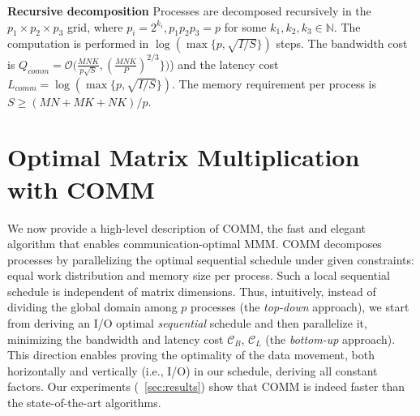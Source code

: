 \documentclass[sigplan,review,anonymous]{acmart}\settopmatter{printfolios=true,printccs=false,printacmref=false}
\newcommand\mac[1]{\textcolor{red}{[Mac: #1]}}
\newcommand{\macb}[1]{\textbf{\textsf{#1}}}
\begin{document}
\macb{Recursive decomposition}
%
Processes are decomposed recursively in the $p_1 \times p_2 \times p_3$ grid,
where $p_i = 2^{k_i}, p_1 p_2 p_3 = p$ for some $k_1, k_2, k_3 \in \mathbb{N}$.
The computation is performed in $\log (\max \{p,\sqrt{I/S} \})$ steps.  The
bandwidth cost is $Q_{comm} = \mathcal{O}\Big(\frac{MNK}{p\sqrt{S}},
\left(\frac{MNK}{P}\right)^{2/3} \Big\} \Big)$) and the latency cost \\ 
$L_{comm}
= \log (\max \{p,\sqrt{I/S} \})$. The memory requirement per process is $S \ge
(MN + MK + NK)/p$. 

\section{Optimal Matrix Multiplication with COMM}
%
%

We now provide a high-level description of COMM, the fast and elegant algorithm 
that
enables communication-optimal MMM.
COMM  decomposes processes by
parallelizing the optimal sequential schedule under given constraints: equal
work distribution and memory size per process. Such
a local sequential schedule is independent of matrix dimensions.
Thus, intuitively, instead of dividing  the global
domain among $p$ processes (the \emph{top-down} approach), we start from 
deriving an I/O optimal \emph{sequential} schedule and
then parallelize it, minimizing the bandwidth and latency cost $\mathcal{C}_B$,
$\mathcal{C}_L$ (the \emph{bottom-up} approach). This direction enables proving 
the optimality of the data movement, both
horizontally and vertically (i.e., I/O) in our
schedule, deriving all constant factors. Our experiments (~\cref{sec:results}) 
show that COMM is indeed faster than the
state-of-the-art algorithms.
\end{document}
